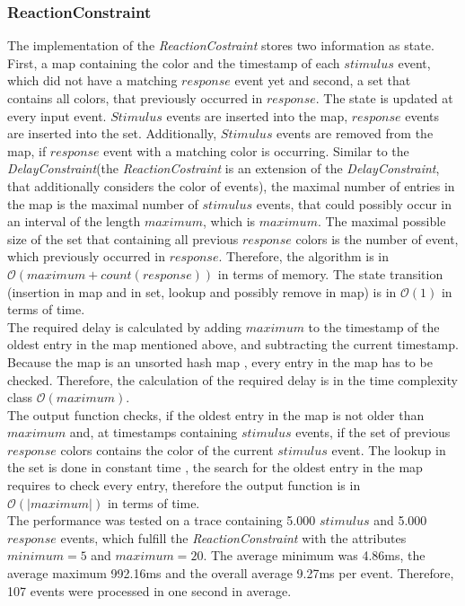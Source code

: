 \subsubsection{ReactionConstraint}
	The implementation of the \emph{ReactionCostraint} stores two information as state. First, a map containing the color and the timestamp of each $stimulus$ event, which did not have a matching $response$ event yet and second, a set that contains all colors, that previously occurred in $response$. The state is updated at every input event. $Stimulus$ events are inserted into the map, $response$ events are inserted into the set. Additionally, $Stimulus$ events are removed from the map, if $response$ event with a matching color is occurring. Similar to the \emph{DelayConstraint}(the \emph{ReactionCostraint} is an extension of the \emph{DelayConstraint}, that additionally considers the color of events), the maximal number of entries in the map is the maximal number of $stimulus$ events, that could possibly occur in an interval of the length $maximum$, which is $maximum$. The maximal possible size of the set that containing all previous $response$ colors is the number of event, which previously occurred in $response$. Therefore, the algorithm is in $\mathcal{O}(maximum+count(response))$ in terms of memory. The state transition (insertion in map and in set, lookup and possibly remove in map) is in $\mathcal{O}(1)$ in terms of time.\\%
	The required delay is calculated by adding $maximum$ to the timestamp of the oldest entry in the map mentioned above, and subtracting the current timestamp. Because the map is an unsorted hash map%
	, every entry in the map has to be checked. Therefore, the calculation of the required delay is in the time complexity class $\mathcal{O}(maximum)$.\\
	The output function checks, if the oldest entry in the map is not older than $maximum$ and, at timestamps containing $stimulus$ events, if the set of previous $response$ colors contains the color of the current $stimulus$ event. The lookup in the set is done in constant time%
	, the search for the oldest entry in the map requires to check every entry, therefore the output function is in $\mathcal{O}(|maximum|)$ in terms of time.\\
	The performance was tested on a trace containing 5.000 $stimulus$ and 5.000 $response$ events, which fulfill the \emph{ReactionConstraint} with the attributes $minimum=5$ and $maximum=20$. The average minimum was 4.86ms, the average maximum 992.16ms and the overall average 9.27ms per event. Therefore, 107 events were processed in one second in average.\\
